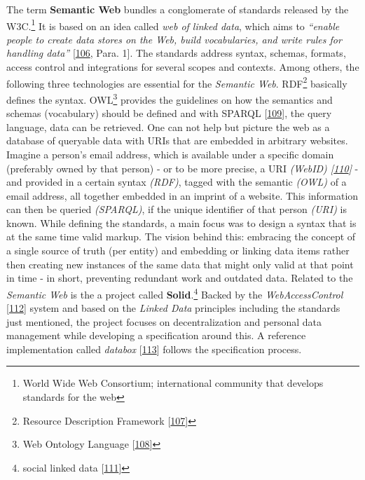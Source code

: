 \documentclass[12pt,english,a4paper,titlepage,cleardoublepage=empty,dottedtoc]{report}
\begin{document}
The term \textbf{\protect\hypertarget{def--semantic-web}{}{Semantic
Web}} bundles a conglomerate of standards released by the W3C.\footnote{World
  Wide Web Consortium; international community that develops standards
  for the web} It is based on an idea called \emph{web of linked data},
which aims to \emph{``enable people to create data stores on the Web,
build vocabularies, and write rules for handling data''}
{[}\protect\hyperlink{ref-web_2016_w3c_semantic-web-activity}{106},
Para. 1{]}. The standards address syntax, schemas, formats, access
control and integrations for several scopes and contexts. Among others,
the following three technologies are essential for the \emph{Semantic
Web}. RDF\footnote{Resource Description Framework
  {[}\protect\hyperlink{ref-web_w3c-tr_rdf}{107}{]}} basically defines
the syntax. OWL\footnote{Web Ontology Language
  {[}\protect\hyperlink{ref-web_w3c-tr_owl}{108}{]}} provides the
guidelines on how the semantics and schemas (vocabulary) should be
defined and with \protect\hypertarget{def--sparql}{}{SPARQL}
{[}\protect\hyperlink{ref-web_w3c-tr_sparql}{109}{]}, the query
language, data can be retrieved. One can not help but picture the web as
a database of queryable data with URIs that are embedded in arbitrary
websites. Imagine a person's email address, which is available under a
specific domain (preferably owned by that person) - or to be more
precise, a URI \emph{(WebID)
{[}\protect\hyperlink{ref-web_w3c-draft_webid}{110}{]}} - and provided
in a certain syntax \emph{(RDF)}, tagged with the semantic \emph{(OWL)}
of a email address, all together embedded in an imprint of a website.
This information can then be queried \emph{(SPARQL)}, if the unique
identifier of that person \emph{(URI)} is known. While defining the
standards, a main focus was to design a syntax that is at the same time
valid markup. The vision behind this: embracing the concept of a single
source of truth (per entity) and embedding or linking data items rather
then creating new instances of the same data that might only valid at
that point in time - in short, preventing redundant work and outdated
data. Related to the \emph{Semantic Web} is the a project called
\textbf{Solid}.\footnote{social linked data
  {[}\protect\hyperlink{ref-web_spec_solid}{111}{]}} Backed by the
\emph{WebAccessControl}
{[}\protect\hyperlink{ref-web_2016_wiki_webaccesscontrol}{112}{]} system
and based on the \emph{Linked Data} principles including the standards
just mentioned, the project focuses on decentralization and personal
data management while developing a specification around this. A
reference implementation called \emph{databox}
{[}\protect\hyperlink{ref-web_2016_demo_databox}{113}{]} follows the
specification process.
\end{document}
